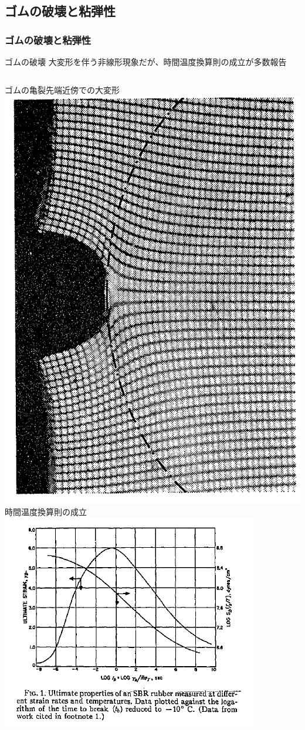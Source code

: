\documentclass[11pt, dvipdfmx]{beamer}
\begin{document}
\subsection{ゴムの破壊と粘弾性}
\begin{frame}
    \frametitle{ゴムの破壊と粘弾性}
    
    \vspace{-2mm}
    \begin{alertblock}{ゴムの破壊}
    大変形を伴う非線形現象だが、時間温度換算則の成立が多数報告
    \end{alertblock}
    
    \begin{columns}[totalwidth=1\textwidth]
    ゴムの亀裂先端近傍での大変形
    \centering
    \includegraphics[width=.7\textwidth]{./fig/rubber_crack.png}
    時間温度換算則の成立
    \centering
    \includegraphics[width=\textwidth]{./fig/Time_Temp_2.png}
    

\end{columns}
\end{frame}
\end{document}
